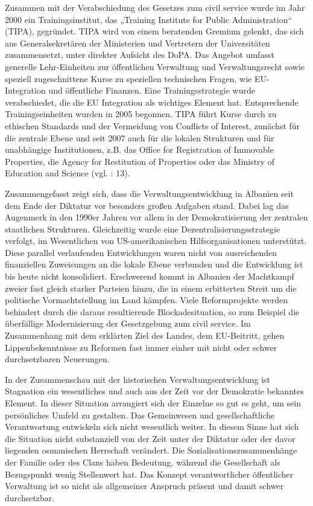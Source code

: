 Zusammen mit der Verabschiedung des Gesetzes zum civil service wurde im Jahr 2000 ein Trainingsinstitut, das „Training Institute for Public Administration“ (TIPA), gegründet. TIPA wird von einem beratenden Gremium gelenkt, das sich aus Generalsekretären der Ministerien und Vertretern der Universitäten zusammensetzt, unter direkter Aufsicht des DoPA. Das Angebot umfasst generelle Lehr-Einheiten zur öffentlichen Verwaltung und Verwaltungsrecht sowie speziell zugeschnittene Kurse zu speziellen technischen Fragen, wie EU-Integration und öffentliche Finanzen. Eine Trainingsstrategie wurde verabschiedet, die die EU Integration als wichtiges Element hat. Entsprechende Trainingseinheiten wurden in 2005 begonnen. TIPA führt Kurse durch zu ethischen Standards und der Vermeidung von Conflicts of Interest, zunächst für die zentrale Ebene und seit 2007 auch für die lokalen Strukturen und für unabhängige Institutionen, z.B. das Office for Registration of Immovable Properties, die Agency for Restitution of Properties oder das Ministry of Education and Science (vgl.  \cite{oecd09}: 13).\par
Zusammengefasst zeigt sich, dass die Verwaltungsentwicklung in Albanien seit dem Ende der Diktatur vor besonders großen Aufgaben stand. Dabei lag das Augenmerk in den 1990er Jahren vor allem in der Demokratisierung der zentralen staatlichen Strukturen. Gleichzeitig wurde eine Dezentralisierungsstrategie verfolgt, im Wesentlichen von US-amerikanischen Hilfsorganisationen unterstützt. Diese parallel verlaufenden Entwicklungen waren nicht von ausreichenden finanziellen Zuweisungen an die lokale Ebene verbunden und die Entwicklung ist bis heute nicht konsolidiert. Erschwerend kommt in Albanien der Machtkampf zweier fast gleich starker Parteien hinzu, die in einem erbitterten Streit um die politische Vormachtstellung im Land kämpfen. Viele Reformprojekte werden behindert durch die daraus resultierende Blockadesituation, so zum Beispiel die überfällige Modernisierung der Gesetzgebung zum civil service. Im Zusammenhang mit dem erklärten Ziel des Landes, dem EU-Beitritt, gehen Lippenbekenntnisse zu Reformen fast immer einher mit nicht oder schwer durchsetzbaren Neuerungen.\par
In der Zusammenschau mit der historischen Verwaltungsentwicklung ist Stagnation ein wesentliches und auch aus der Zeit vor der Demokratie bekanntes Element. In dieser Situation arrangiert sich der Einzelne so gut es geht, um sein persönliches Umfeld zu gestalten. Das Gemeinwesen und gesellschaftliche Verantwortung entwickeln sich nicht wesentlich weiter. In diesem Sinne hat sich die Situation nicht substanziell von der Zeit unter der Diktatur oder der davor liegenden osmanischen Herrschaft verändert. Die Sozialisationszusammenhänge der Familie oder des Clans haben Bedeutung, während die Gesellschaft als Bezugspunkt wenig Stellenwert hat. Das Konzept verantwortlicher öffentlicher Verwaltung ist so nicht als allgemeiner Anspruch präsent und damit schwer durchsetzbar.
